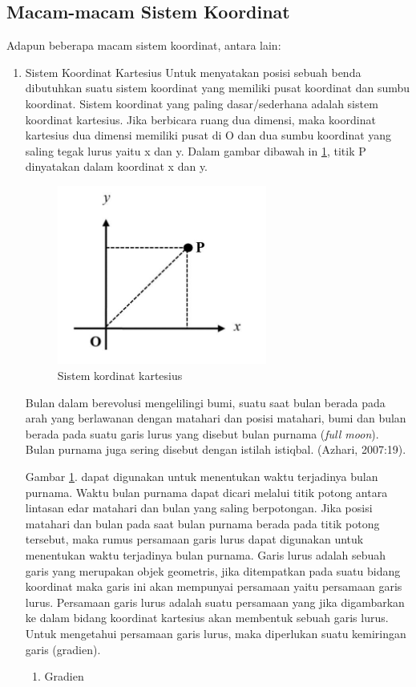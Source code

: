 \subsection{Macam-macam Sistem Koordinat}
Adapun beberapa macam sistem koordinat, antara lain:
\begin{enumerate}
\item Sistem Koordinat Kartesius
Untuk menyatakan posisi sebuah benda dibutuhkan suatu sistem koordinat yang memiliki pusat koordinat dan sumbu koordinat. Sistem koordinat yang paling dasar/sederhana adalah sistem koordinat kartesius. Jika berbicara ruang dua dimensi, maka koordinat kartesius dua dimensi memiliki pusat di O dan dua sumbu koordinat yang saling tegak lurus yaitu x dan y. Dalam gambar dibawah in \ref{kartesius}, titik P dinyatakan dalam koordinat x dan y.
\begin{figure}[ht]
	\centerline{\includegraphics[width=0.65\textwidth]{pictures/kordinatkartesius.jpg}}
	\caption{Sistem kordinat kartesius}
	\label{kartesius}
	\end{figure}
Bulan dalam berevolusi mengelilingi bumi, suatu saat bulan berada pada arah yang berlawanan dengan matahari dan posisi matahari, bumi dan bulan berada pada suatu garis lurus yang disebut bulan purnama (\textit {full moon}). Bulan purnama juga sering disebut dengan istilah istiqbal. (Azhari, 2007:19).

Gambar \ref{kartesius}. dapat digunakan untuk menentukan waktu terjadinya bulan purnama. Waktu bulan purnama dapat dicari melalui titik potong antara lintasan edar matahari dan bulan yang saling berpotongan. Jika posisi matahari dan bulan pada saat bulan purnama berada pada titik potong tersebut, maka rumus persamaan garis lurus dapat digunakan untuk menentukan waktu terjadinya bulan purnama. Garis lurus adalah sebuah garis yang merupakan objek geometris, jika ditempatkan pada suatu bidang koordinat maka garis ini akan mempunyai  persamaan yaitu persamaan garis lurus. Persamaan garis lurus adalah suatu persamaan yang jika digambarkan ke dalam bidang koordinat kartesius akan membentuk sebuah garis lurus. Untuk mengetahui persamaan garis lurus, maka diperlukan suatu kemiringan garis (gradien).
	\begin{enumerate}
	\item Gradien
	\end{enumerate}
\end{enumerate}